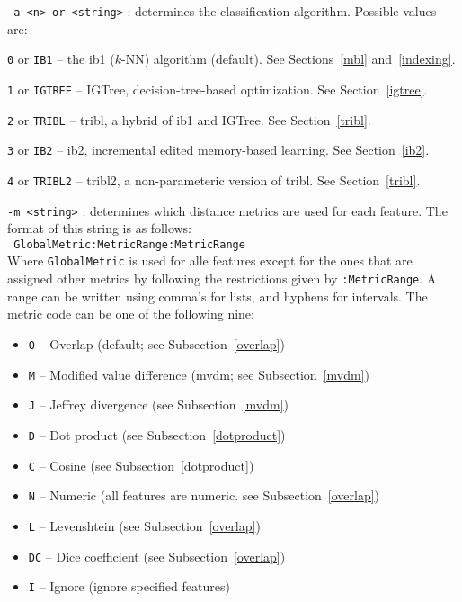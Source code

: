 \documentclass{book}
\begin{document}
\begin{description}

\item {\tt -a <n> or <string>} : determines the classification
algorithm. Possible values are:

	\begin{description}
	\item {\tt 0} or {\tt IB1} -- the {\sc ib1} ($k$-NN) algorithm (default). See Sections~\ref{mbl} and~\ref{indexing}.
	\item {\tt 1} or {\tt IGTREE} -- {\sc IGTree}, decision-tree-based optimization. See Section~\ref{igtree}.
	\item {\tt 2} or {\tt TRIBL} -- {\sc tribl}, a hybrid of {\sc ib1} and {\sc IGTree}. See Section~\ref{tribl}.
	\item {\tt 3} or {\tt IB2} -- {\sc ib2}, incremental edited memory-based learning. See Section~\ref{ib2}.
	\item {\tt 4} or {\tt TRIBL2} -- {\sc tribl2}, a non-parameteric version of {\sc tribl}. See Section~\ref{tribl}.
	\end{description}

\item {\tt -m <string>} : determines which distance metrics are used
for each feature. The format of this string is as follows:\\ {\tt
GlobalMetric:MetricRange:MetricRange}\\ Where {\tt GlobalMetric} is
used for alle features except for the ones that are assigned other
metrics by following the restrictions given by {\tt :MetricRange}.  A
range can be written using comma's for lists, and hyphens for
intervals. The metric code can be one of the following nine:

\begin{itemize}
\item {\tt O} -- Overlap (default; see Subsection~\ref{overlap})
\item {\tt M} -- Modified value difference ({\sc mvdm}; see Subsection~\ref{mvdm})
\item {\tt J} -- Jeffrey divergence (see Subsection~\ref{mvdm})
\item {\tt D} -- Dot product (see Subsection~\ref{dotproduct})
\item {\tt C} -- Cosine (see Subsection~\ref{dotproduct})
\item {\tt N} -- Numeric (all features are numeric. see Subsection~\ref{overlap})
\item {\tt L} -- Levenshtein (see Subsection~\ref{overlap})
\item {\tt DC} -- Dice coefficient (see Subsection~\ref{overlap})
\item {\tt I} -- Ignore (ignore specified features)
\end{itemize}


\end{description}
\end{document}
